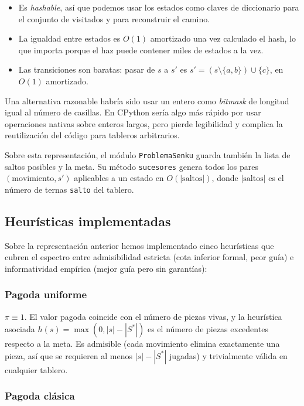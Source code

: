 \documentclass[conference,a4paper]{IEEEtran}
\begin{document}
\begin{itemize}
\item Es \emph{hashable}, así que podemos usar los estados como claves de
  diccionario para el conjunto de visitados y para reconstruir el camino.
\item La igualdad entre estados es $O(1)$ amortizado una vez calculado el
  hash, lo que importa porque el haz puede contener miles de estados a la
  vez.
\item Las transiciones son baratas: pasar de $s$ a $s'$ es
  $s' = (s \setminus \{a,b\}) \cup \{c\}$, en $O(1)$ amortizado.
\end{itemize}

Una alternativa razonable habría sido usar un entero como
\emph{bitmask} de longitud igual al número de casillas. En CPython sería
algo más rápido por usar operaciones nativas sobre enteros largos, pero
pierde legibilidad y complica la reutilización del código para tableros
arbitrarios.

Sobre esta representación, el módulo \texttt{ProblemaSenku} guarda
también la lista de saltos posibles y la meta. Su método \texttt{sucesores}
genera todos los pares $(\text{movimiento}, s')$ aplicables a un estado
en $O(|\text{saltos}|)$, donde $|\text{saltos}|$ es el número de ternas
\texttt{salto} del tablero.


\subsection{Heurísticas implementadas}

Sobre la representación anterior hemos implementado cinco heurísticas
que cubren el espectro entre admisibilidad estricta (cota inferior
formal, peor guía) e informatividad empírica (mejor guía pero sin
garantías):

\subsubsection{Pagoda uniforme}

$\pi \equiv 1$. El valor pagoda coincide con el número de piezas vivas, y
la heurística asociada $h(s) = \max(0,|s|-|S^*|)$ es el número de piezas
excedentes respecto a la meta. Es admisible (cada movimiento elimina
exactamente una pieza, así que se requieren al menos $|s|-|S^*|$ jugadas)
y trivialmente válida en cualquier tablero.

\subsubsection{Pagoda clásica}
\end{document}
